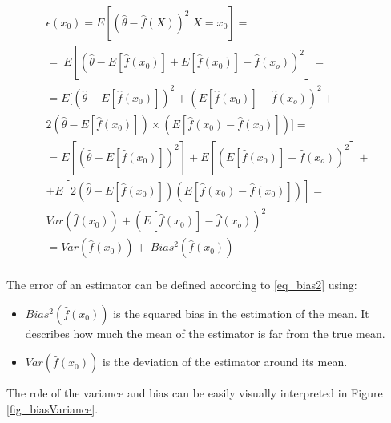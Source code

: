 \begin{equation}
    \label{eq_bias2}
    \begin{split}
    \epsilon\left(x_0\right) = E\left[\left(\hat{\theta}-\hat{f}\left(X\right)\right)^2|X=x_0\right]= \\
     =\ E\left[\left(\hat{\theta}-E\left[\hat{f}\left(x_0\right)\right]+E\left[\hat{f}\left(x_0\right)\right]-\hat{f}\left(x_o\right)\right)^2\right]=\\
     = E[\left(\hat{\theta}-E\left[\hat{f}\left(x_0\right)\right]\right)^2 + \left(E\left[\hat{f}\left(x_0\right)\right]-\hat{f}\left(x_o\right)\right)^2 + \\ 2\left(\hat{\theta}-E\left[\hat{f}\left(x_0\right)\right]\right)\times \left(E\left[\hat{f}\left(x_0\right)-\hat{f}(x_0)\right]\right)]=\\
     =E\left[\left(\hat{\theta}-E\left[\hat{f}\left(x_0\right)\right]\right)^2\right] +E\left[\left(E\left[\hat{f}\left(x_0\right)\right]-\hat{f}\left(x_o\right)\right)^2\right] + \\
     + E\left[2\left(\hat{\theta}-E\left[\hat{f}\left(x_0\right)\right]\right)\left(E\left[\hat{f}\left(x_0\right)-\hat{f}\left(x_0\right)\right]\right)\right]=\\
     Var\left(\hat{f}\left(x_0\right)\right)+\left(E\left[\hat{f}\left(x_0\right)\right]-\hat{f}\left(x_o\right)\right)^2\\
     =Var\left(\hat{f}\left(x_0\right)\right)+\ Bias^2\left(\hat{f}\left(x_0\right)\right)\\
    \end{split}
\end{equation}


The error of an estimator can be defined according to \ref{eq_bias2} using:
\begin{itemize}
    \item 	$Bias^2\left(\hat{f}\left(x_0\right)\right)$ is the squared bias in the estimation of the mean. It describes how much the mean of the estimator is far from the true mean.
    \item 	$Var\left(\hat{f}\left(x_0\right)\right)$ is the deviation of the estimator around its mean.
\end{itemize}

The role of the variance and bias can be easily visually interpreted in Figure \ref{fig_biasVariance}.

